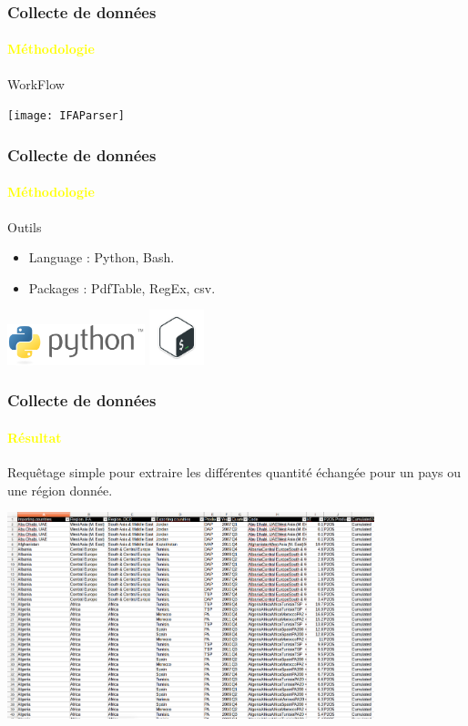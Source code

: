 \documentclass{beamer}
\begin{document}
\begin{frame}
  \frametitle{Collecte de données}
  \framesubtitle{\textbf{\textcolor{yellow}{Méthodologie}}}
	\begin{block}{WorkFlow}
    		\begin{center}
    		\texttt{[image: IFAParser]}
    		\end{center}
	\end{block}
\end{frame}


\begin{frame}
  \frametitle{Collecte de données}
  \framesubtitle{\textbf{\textcolor{yellow}{Méthodologie}}}

  \begin{block}{Outils}
  	\begin{itemize}
    		\item Language : Python, Bash.
    		\item Packages : PdfTable, RegEx, csv.
  	\end{itemize}
  		\includegraphics[width=4cm]{python}
  		\hspace{2cm}
		\includegraphics[width=1.6cm]{Bash}
		
  \end{block}
 \end{frame}
 
 \begin{frame}
  \frametitle{Collecte de données}
  \framesubtitle{\textbf{\textcolor{yellow}{Résultat}}}

    Requêtage simple pour extraire les différentes quantité échangée pour un pays ou une région donnée.\vspace{1mm}
	\begin{center}
	\includegraphics[width=0.8\textwidth, height=0.7\textheight, keepaspectratio]{IFAcsv}
	\end{center}
  
 \end{frame}
\end{document}
